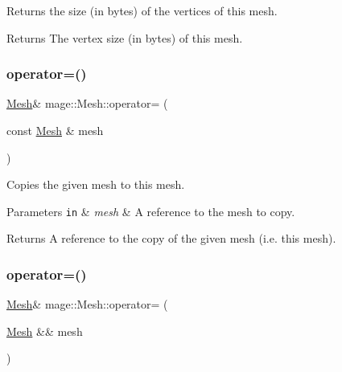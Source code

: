 Returns the size (in bytes) of the vertices of this mesh.

\begin{DoxyReturn}{Returns}
The vertex size (in bytes) of this mesh. 
\end{DoxyReturn}
\hypertarget{classmage_1_1_mesh_a5baf961af32b379671a59a082492bc5e}{}\label{classmage_1_1_mesh_a5baf961af32b379671a59a082492bc5e} 
\subsubsection{\texorpdfstring{operator=()}{operator=()}\hspace{0.1cm}{\footnotesize\ttfamily [1/2]}}
{\footnotesize\ttfamily \hyperlink{classmage_1_1_mesh}{Mesh}\& mage\+::\+Mesh\+::operator= (\begin{DoxyParamCaption}\item[{const \hyperlink{classmage_1_1_mesh}{Mesh} \&}]{mesh }\end{DoxyParamCaption})\hspace{0.3cm}{\ttfamily [delete]}}

Copies the given mesh to this mesh.


\begin{DoxyParams}[1]{Parameters}
\mbox{\tt in}  & {\em mesh} & A reference to the mesh to copy. \\
\hline
\end{DoxyParams}
\begin{DoxyReturn}{Returns}
A reference to the copy of the given mesh (i.\+e. this mesh). 
\end{DoxyReturn}
\hypertarget{classmage_1_1_mesh_a28e437196db171b2df1c4bcf3df07a63}{}\label{classmage_1_1_mesh_a28e437196db171b2df1c4bcf3df07a63} 
\subsubsection{\texorpdfstring{operator=()}{operator=()}\hspace{0.1cm}{\footnotesize\ttfamily [2/2]}}
{\footnotesize\ttfamily \hyperlink{classmage_1_1_mesh}{Mesh}\& mage\+::\+Mesh\+::operator= (\begin{DoxyParamCaption}\item[{\hyperlink{classmage_1_1_mesh}{Mesh} \&\&}]{mesh }\end{DoxyParamCaption})\hspace{0.3cm}{\ttfamily [delete]}}

